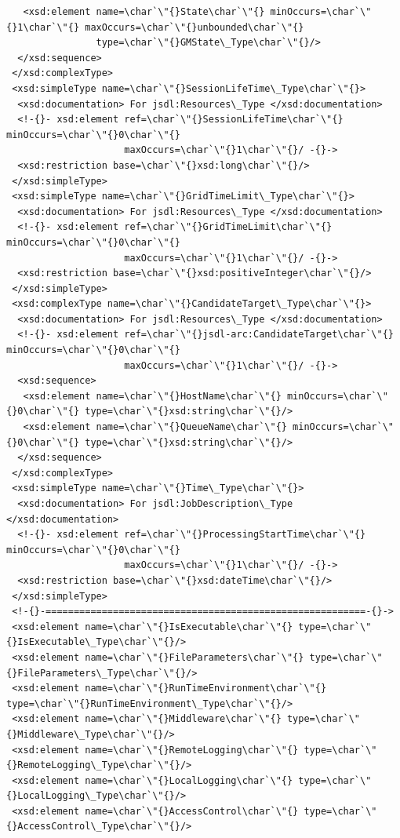 \documentclass{article}                            %
\begin{document}
\begin{footnotesize}
\begin{verbatim}
   <xsd:element name=\char`\"{}State\char`\"{} minOccurs=\char`\"{}1\char`\"{} maxOccurs=\char`\"{}unbounded\char`\"{}
                type=\char`\"{}GMState\_Type\char`\"{}/>
  </xsd:sequence>
 </xsd:complexType>
 <xsd:simpleType name=\char`\"{}SessionLifeTime\_Type\char`\"{}>
  <xsd:documentation> For jsdl:Resources\_Type </xsd:documentation>
  <!-{}- xsd:element ref=\char`\"{}SessionLifeTime\char`\"{} minOccurs=\char`\"{}0\char`\"{}
                     maxOccurs=\char`\"{}1\char`\"{}/ -{}->
  <xsd:restriction base=\char`\"{}xsd:long\char`\"{}/>
 </xsd:simpleType>
 <xsd:simpleType name=\char`\"{}GridTimeLimit\_Type\char`\"{}>
  <xsd:documentation> For jsdl:Resources\_Type </xsd:documentation>
  <!-{}- xsd:element ref=\char`\"{}GridTimeLimit\char`\"{} minOccurs=\char`\"{}0\char`\"{}
                     maxOccurs=\char`\"{}1\char`\"{}/ -{}->
  <xsd:restriction base=\char`\"{}xsd:positiveInteger\char`\"{}/>
 </xsd:simpleType>
 <xsd:complexType name=\char`\"{}CandidateTarget\_Type\char`\"{}>
  <xsd:documentation> For jsdl:Resources\_Type </xsd:documentation>
  <!-{}- xsd:element ref=\char`\"{}jsdl-arc:CandidateTarget\char`\"{} minOccurs=\char`\"{}0\char`\"{}
                     maxOccurs=\char`\"{}1\char`\"{}/ -{}->
  <xsd:sequence>
   <xsd:element name=\char`\"{}HostName\char`\"{} minOccurs=\char`\"{}0\char`\"{} type=\char`\"{}xsd:string\char`\"{}/>
   <xsd:element name=\char`\"{}QueueName\char`\"{} minOccurs=\char`\"{}0\char`\"{} type=\char`\"{}xsd:string\char`\"{}/>
  </xsd:sequence>
 </xsd:complexType>
 <xsd:simpleType name=\char`\"{}Time\_Type\char`\"{}>
  <xsd:documentation> For jsdl:JobDescription\_Type </xsd:documentation>
  <!-{}- xsd:element ref=\char`\"{}ProcessingStartTime\char`\"{} minOccurs=\char`\"{}0\char`\"{}
                     maxOccurs=\char`\"{}1\char`\"{}/ -{}->
  <xsd:restriction base=\char`\"{}xsd:dateTime\char`\"{}/>
 </xsd:simpleType>
 <!-{}-=========================================================-{}->
 <xsd:element name=\char`\"{}IsExecutable\char`\"{} type=\char`\"{}IsExecutable\_Type\char`\"{}/>
 <xsd:element name=\char`\"{}FileParameters\char`\"{} type=\char`\"{}FileParameters\_Type\char`\"{}/>
 <xsd:element name=\char`\"{}RunTimeEnvironment\char`\"{} type=\char`\"{}RunTimeEnvironment\_Type\char`\"{}/>
 <xsd:element name=\char`\"{}Middleware\char`\"{} type=\char`\"{}Middleware\_Type\char`\"{}/>
 <xsd:element name=\char`\"{}RemoteLogging\char`\"{} type=\char`\"{}RemoteLogging\_Type\char`\"{}/>
 <xsd:element name=\char`\"{}LocalLogging\char`\"{} type=\char`\"{}LocalLogging\_Type\char`\"{}/>
 <xsd:element name=\char`\"{}AccessControl\char`\"{} type=\char`\"{}AccessControl\_Type\char`\"{}/>

\end{verbatim}
\end{footnotesize}
\end{document}
